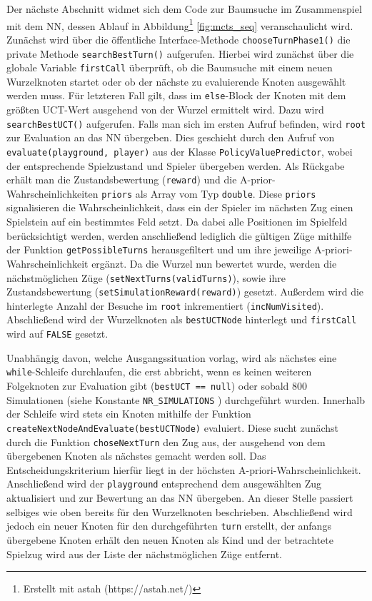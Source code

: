 \documentclass[12pt,a4paper]{article}
\begin{document}
Der nächste Abschnitt widmet sich dem Code zur Baumsuche im Zusammenspiel mit dem NN, dessen Ablauf in Abbildung\footnote{Erstellt mit astah (https://astah.net/)} \ref{fig:mcts_seq} veranschaulicht wird. Zunächst wird über die öffentliche Interface-Methode \texttt{chooseTurnPhase1()} die private Methode \texttt{searchBestTurn()} aufgerufen. Hierbei wird zunächst über die globale Variable \texttt{firstCall} überprüft, ob die Baumsuche mit einem neuen Wurzelknoten startet oder ob der nächste zu evaluierende Knoten ausgewählt werden muss. Für letzteren Fall gilt, dass im \texttt{else}-Block der Knoten mit dem größten UCT-Wert ausgehend von der Wurzel ermittelt wird. Dazu wird \texttt{searchBestUCT()} aufgerufen. Falls man sich im ersten Aufruf befinden, wird \texttt{root} zur Evaluation an das NN übergeben. Dies geschieht durch den Aufruf von \texttt{evaluate(playground, player)} aus der Klasse \texttt{PolicyValuePredictor}, wobei der entsprechende Spielzustand und Spieler übergeben werden. Als Rückgabe erhält man die Zustandsbewertung (\texttt{reward}) und die A-prior-Wahrscheinlichkeiten \texttt{priors} als Array vom Typ \texttt{double}. Diese \texttt{priors} signalisieren die Wahrscheinlichkeit, dass ein der Spieler im nächsten Zug einen Spielstein auf ein bestimmtes Feld setzt. Da dabei alle Positionen im Spielfeld berücksichtigt werden, werden anschließend lediglich die gültigen Züge mithilfe der Funktion \texttt{getPossibleTurns} herausgefiltert und um ihre jeweilige A-priori-Wahrscheinlichkeit ergänzt. Da die Wurzel nun bewertet wurde, werden die nächstmöglichen Züge (\texttt{setNextTurns(validTurns)}), sowie ihre Zustandsbewertung (\texttt{setSimulationReward(reward)}) gesetzt. Außerdem wird die hinterlegte Anzahl der Besuche im \texttt{root} inkrementiert (\texttt{incNumVisited}). Abschließend wird der Wurzelknoten als \texttt{bestUCTNode} hinterlegt und \texttt{firstCall} wird auf \texttt{FALSE} gesetzt. 

Unabhängig davon, welche Ausgangssituation vorlag, wird als nächstes eine \texttt{while}-Schleife durchlaufen, die erst abbricht, wenn es keinen weiteren Folgeknoten zur Evaluation gibt (\texttt{bestUCT == null}) oder sobald 800 Simulationen (siehe Konstante \texttt{NR\_SIMULATIONS} ) durchgeführt wurden. Innerhalb der Schleife wird stets ein Knoten mithilfe der Funktion \texttt{createNextNodeAndEvaluate(bestUCTNode)} evaluiert. Diese sucht zunächst durch die Funktion \texttt{choseNextTurn} den Zug aus, der ausgehend von dem übergebenen Knoten als nächstes gemacht werden soll. Das Entscheidungskriterium hierfür liegt in der höchsten A-priori-Wahrscheinlichkeit. Anschließend wird der \texttt{playground} entsprechend dem ausgewählten Zug aktualisiert und zur Bewertung an das NN übergeben. An dieser Stelle passiert selbiges wie oben bereits für den Wurzelknoten beschrieben. Abschließend wird jedoch ein neuer Knoten für den durchgeführten \texttt{turn} erstellt, der anfangs übergebene Knoten erhält den neuen Knoten als Kind und der betrachtete Spielzug wird aus der Liste der nächstmöglichen Züge entfernt.
\end{document}
